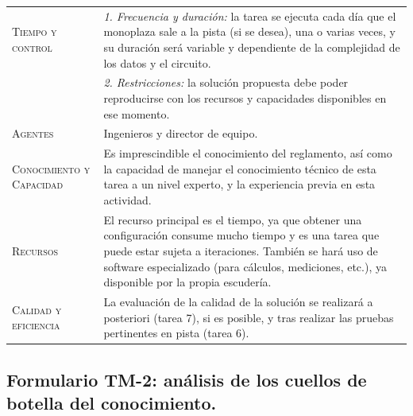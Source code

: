 \documentclass[12pt,a4paper,twoside,spanish]{article}      %
\begin{document}
\begin{table}[H]
\begin{tabularx}{\textwidth}{|l|X|}
\textsc{Tiempo y control} & 
\textit{1. Frecuencia y duración:} la tarea se ejecuta cada día que el monoplaza sale a la pista (si se desea), una o varias veces, y su duración será variable y dependiente de la complejidad de los datos y el circuito. \\ & 
\textit{2. Restricciones:} la solución propuesta debe poder reproducirse con los recursos y capacidades disponibles en ese momento. \\ \hline

\textsc{Agentes} &
Ingenieros y director de equipo.\\ \hline

\textsc{Conocimiento y Capacidad} &
Es imprescindible el conocimiento del reglamento, así como la capacidad de manejar el conocimiento técnico de esta tarea a un nivel experto, y la experiencia previa en esta actividad. \\ \hline

\textsc{Recursos} &
El recurso principal es el tiempo, ya que obtener una configuración consume mucho tiempo y es una tarea que puede estar sujeta a iteraciones. También se hará uso de software especializado (para cálculos, mediciones, etc.), ya disponible por la propia escudería. \\ \hline

\textsc{Calidad y eficiencia} &
La evaluación de la calidad de la solución se realizará a posteriori (tarea 7), si es posible, y tras realizar las pruebas pertinentes en pista (tarea 6).
\\ \hline

\end{tabularx}

  \label{tab.TM1}
\end{table}

\pagebreak
\subsection{Formulario TM-2: análisis de los cuellos de botella del conocimiento.}
\end{document}
